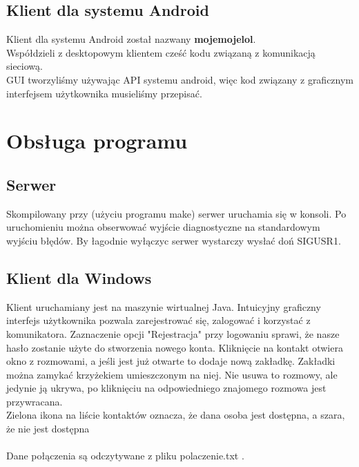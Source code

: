 \documentclass[10pt,a4paper]{article}
\begin{document}
	\subsection{Klient dla systemu Android}
		Klient dla systemu Android został nazwany \textbf{mojemojelol}.\\
		Współdzieli z desktopowym klientem cześć kodu związaną z komunikacją sieciową.\\
		GUI tworzyliśmy używając API systemu android, więc kod związany z graficznym interfejsem użytkownika musieliśmy  przepisać.
	
\section{Obsługa programu}
	\subsection{Serwer}
		Skompilowany przy (użyciu programu make) serwer uruchamia się w konsoli.
		Po uruchomieniu można obserwować wyjście diagnostyczne na standardowym wyjściu błędów.
		By łagodnie wyłączyc serwer wystarczy wysłać doń SIGUSR1.
	\subsection{Klient dla Windows}
		Klient uruchamiany jest na maszynie wirtualnej Java.
		Intuicyjny graficzny interfejs użytkownika pozwala zarejestrować się, zalogować i korzystać z komunikatora.
		Zaznaczenie opcji "Rejestracja" przy logowaniu sprawi, że nasze hasło zostanie użyte do stworzenia nowego konta.
		Kliknięcie na kontakt otwiera okno z rozmowami, a jeśli jest już otwarte to dodaje nową zakładkę.
		Zakładki można zamykać krzyżekiem umieszczonym na niej. Nie usuwa to rozmowy, ale jedynie ją ukrywa, po kliknięciu
		na odpowiedniego znajomego rozmowa jest przywracana. \\
		Zielona ikona na liście kontaktów oznacza, że dana osoba jest dostępna, a szara, że nie jest dostępna \\ \\
		Dane połączenia są odczytywane z pliku polaczenie.txt .
\end{document}
